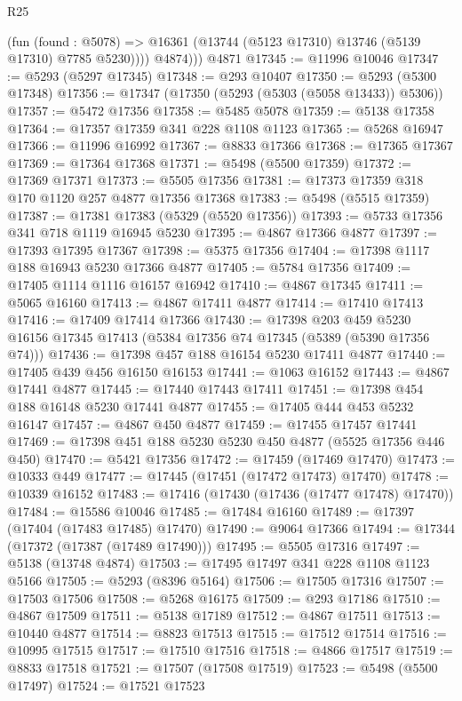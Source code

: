 \begin{lexlean}{R25}
\begin{coremodule}
            (fun (found : @5078) =>
            @16361 (@13744 (@5123 @17310) @13746 (@5139 @17310) @7785 @5230))))
          @4874)))
    @4871
@17345 := @11996 @10046
@17347 := @5293 (@5297 @17345)
@17348 := @293 @10407
@17350 := @5293 (@5300 @17348)
@17356 := @17347 (@17350 (@5293 (@5303 (@5058 @13433)) @5306))
@17357 := @5472 @17356
@17358 := @5485 @5078
@17359 := @5138 @17358
@17364 := @17357 @17359 @341 @228 @1108 @1123
@17365 := @5268 @16947
@17366 := @11996 @16992
@17367 := @8833 @17366
@17368 := @17365 @17367
@17369 := @17364 @17368
@17371 := @5498 (@5500 @17359)
@17372 := @17369 @17371
@17373 := @5505 @17356
@17381 := @17373 @17359 @318 @170 @1120 @257 @4877 @17356 @17368
@17383 := @5498 (@5515 @17359)
@17387 := @17381 @17383 (@5329 (@5520 @17356))
@17393 := @5733 @17356 @341 @718 @1119 @16945 @5230
@17395 := @4867 @17366 @4877
@17397 := @17393 @17395 @17367
@17398 := @5375 @17356
@17404 := @17398 @1117 @188 @16943 @5230 @17366 @4877
@17405 := @5784 @17356
@17409 := @17405 @1114 @1116 @16157 @16942
@17410 := @4867 @17345
@17411 := @5065 @16160
@17413 := @4867 @17411 @4877
@17414 := @17410 @17413
@17416 := @17409 @17414 @17366
@17430 := @17398
    @203
    @459
    @5230
    @16156
    @17345
    @17413
    (@5384 @17356 @74 @17345 (@5389 (@5390 @17356 @74)))
@17436 := @17398 @457 @188 @16154 @5230 @17411 @4877
@17440 := @17405 @439 @456 @16150 @16153
@17441 := @1063 @16152
@17443 := @4867 @17441 @4877
@17445 := @17440 @17443 @17411
@17451 := @17398 @454 @188 @16148 @5230 @17441 @4877
@17455 := @17405 @444 @453 @5232 @16147
@17457 := @4867 @450 @4877
@17459 := @17455 @17457 @17441
@17469 := @17398 @451 @188 @5230 @5230 @450 @4877 (@5525 @17356 @446 @450)
@17470 := @5421 @17356
@17472 := @17459 (@17469 @17470)
@17473 := @10333 @449
@17477 := @17445 (@17451 (@17472 @17473) @17470)
@17478 := @10339 @16152
@17483 := @17416 (@17430 (@17436 (@17477 @17478) @17470))
@17484 := @15586 @10046
@17485 := @17484 @16160
@17489 := @17397 (@17404 (@17483 @17485) @17470)
@17490 := @9064 @17366
@17494 := @17344 (@17372 (@17387 (@17489 @17490)))
@17495 := @5505 @17316
@17497 := @5138 (@13748 @4874)
@17503 := @17495 @17497 @341 @228 @1108 @1123 @5166
@17505 := @5293 (@8396 @5164)
@17506 := @17505 @17316
@17507 := @17503 @17506
@17508 := @5268 @16175
@17509 := @293 @17186
@17510 := @4867 @17509
@17511 := @5138 @17189
@17512 := @4867 @17511
@17513 := @10440 @4877
@17514 := @8823 @17513
@17515 := @17512 @17514
@17516 := @10995 @17515
@17517 := @17510 @17516
@17518 := @4866 @17517
@17519 := @8833 @17518
@17521 := @17507 (@17508 @17519)
@17523 := @5498 (@5500 @17497)
@17524 := @17521 @17523

\end{coremodule}
\end{lexlean}
